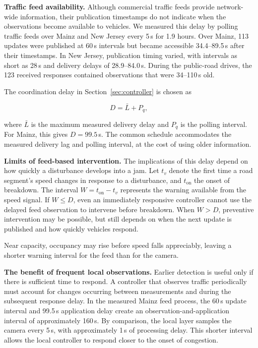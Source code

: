 \documentclass[letterpaper, 10pt, journal, twoside]{IEEEtran}
\begin{document}
\label{sec:feed}

\noindent\textbf{Traffic feed availability.} Although commercial traffic feeds provide network-wide information, their publication timestamps do not indicate when the observations become available to vehicles. We measured this delay by polling traffic feeds over Mainz and New Jersey every 5\,s for 1.9 hours. Over Mainz, 113 updates were published at 60\,s intervals but became accessible 34.4--89.5\,s after their timestamps. In New Jersey, publication timing varied, with intervals as short as 28\,s and delivery delays of 28.9--84.0\,s. During the public-road drives, the 123 received responses contained observations that were 34--110\,s old.

The coordination delay in Section~\ref{sec:controller} is chosen as

\[
D=\bar{L}+P_q,
\]

where $\bar{L}$ is the maximum measured delivery delay and $P_q$ is the polling interval. For Mainz, this gives $D=99.5$\,s. The common schedule accommodates the measured delivery lag and polling interval, at the cost of using older information.

\noindent\textbf{Limits of feed-based intervention.} The implications of this delay depend on how quickly a disturbance develops into a jam. Let $t_v$ denote the first time a road segment's speed changes in response to a disturbance, and $t_{\mathrm{on}}$ the onset of breakdown. The interval $W=t_{\mathrm{on}}-t_v$ represents the warning available from the speed signal. If $W\leq D$, even an immediately responsive controller cannot use the delayed feed observation to intervene before breakdown. When $W>D$, preventive intervention may be possible, but still depends on when the next update is published and how quickly vehicles respond.

Near capacity, occupancy may rise before speed falls appreciably, leaving a shorter warning interval for the feed than for the camera.

\noindent\textbf{The benefit of frequent local observations.} Earlier detection is useful only if there is sufficient time to respond. A controller that observes traffic periodically must account for changes occurring between measurements and during the subsequent response delay. In the measured Mainz feed process, the 60\,s update interval and 99.5\,s application delay create an observation-and-application interval of approximately 160\,s. By comparison, the local layer samples the camera every 5\,s, with approximately 1\,s of processing delay. This shorter interval allows the local controller to respond closer to the onset of congestion.
\end{document}
